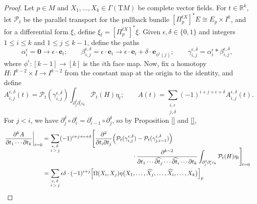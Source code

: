 \begin{proof}
Let $p \in M$ and $X_1, \ldots, X_k \in \Gamma(\mathrm{T}M)$ be complete vector fields. For $t \in \mathbb{R}^k$, let $\mathcal{P}_t$ be the parallel transport for the pullback bundle $[\Pi^{tX}_p]^*E \cong E_p \times I^k$, and for a differential form $\xi$, define $\xi_t = [\Pi^{tX}_p]^* \xi$. Given $\epsilon, \delta \in \{0, 1\}$ and integers $1 \leq i \leq k$ and $1 \leq j \leq k - 1$, define the paths
\begin{equation}
  \alpha_i^\epsilon = \mathbf{0} \to \epsilon \cdot \mathbf{e}_i; \quad \quad \beta_{i, j}^{\epsilon, \delta} = \epsilon \cdot \mathbf{e}_i \to \epsilon \cdot \mathbf{e}_i + \delta \cdot \mathbf{e}_{\phi^i(j)}; \quad \quad \gamma_{i, j}^{\epsilon, \delta} = \alpha_i^\epsilon \ast \beta_{i, j}^{\epsilon, \delta},
\end{equation}
where $\phi^i \colon [k-1] \to [k]$ is the $i$th face map. Now, fix a homotopy $H \colon I^{k-2} \times I \to I^{k-2}$ from the constant map at the origin to the identity, and define
\begin{equation}
  A_{i,j}^{\epsilon, \delta}(t) = \mathcal{P}_t(\gamma_{i, j}^{\epsilon, \delta}) \int_{\partial_j^\delta \partial_i^\epsilon \iota_k} \mathcal{P}_t(H) \eta_t; \quad \quad A(t)= \sum_{\substack{i, \epsilon \\ j, \delta}} (-1)^{i+j+\epsilon+\delta} A_{i, j}^{\epsilon, \delta}(t).
\end{equation}
For $j < i$, we have $\partial_j^\delta \circ \partial_i^\epsilon = \partial_{i-1}^\epsilon \circ \partial_{j}^\delta$, so by Proposition \ref{} and \ref{},
\begin{align}
  \left.\frac{\partial^k A}{\partial t_1 \cdots \partial t_k}\right|_{t = 0} &= \sum_{\substack{\epsilon,\, \delta \\ i \, > \, j}} (-1)^{i+j+\epsilon+\delta} \Bigg[\frac{\partial^2}{\partial t_i \partial t_j} \Big(\mathcal{P}_t(\gamma_{i,j}^{\epsilon, \delta}) - \mathcal{P}_t(\gamma_{j, i-1}^{\epsilon, \delta})\Big) \nonumber \\[-3ex]
  &\mskip 270mu \cdot \frac{\partial^{k-2}}{\partial t_1 \cdots \widehat{\partial t_j} \cdots \widehat{\partial t_i} \cdots \partial t_k} \int_{\partial_j^\delta \partial_i^\epsilon \iota_k} \mathcal{P}_t(H) \eta_t\Bigg]_{\!t = 0} \nonumber \\
  &= \sum_{\substack{\epsilon,\, \delta \\ i \, > \, j}} \epsilon \delta \cdot (-1)^{i+j} \Big[\Omega( X_i, X_j) \eta\big(X_1, \ldots, \widehat{X_j}, \ldots, \widehat{X_i}, \ldots, X_k\big)\Big]_p \nonumber \\

\end{align}
\end{proof}
